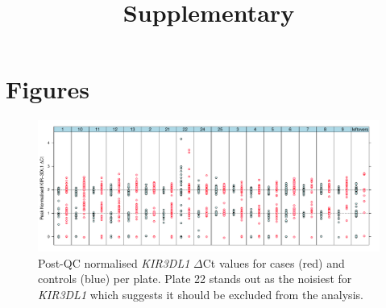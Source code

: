 \documentclass[12pt,a4paper,twoside]{article}
\title{ Supplementary }
\date{}
\begin{document}
\maketitle
\noindent

\renewcommand\figurename{Supplementary Figure}
\renewcommand\tablename{Supplementary Table} 







\section{Figures}

\begin{figure}[h]
    \centering
    \includegraphics[scale=.5] {figures/normalised-median.pdf}
    \caption{
        Post-QC normalised \emph{KIR3DL1} $\Delta$Ct values for cases (red) and controls (blue) per plate.
        Plate 22 stands out as the noisiest for \emph{KIR3DL1} which suggests it should be excluded from the analysis.
    }
    \label{figure:normalised-median}
\end{figure}
\end{document}
